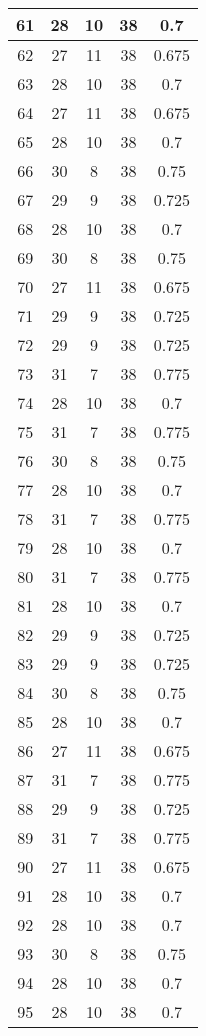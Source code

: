 \documentclass[letterpaper, 12pt]{article}
\begin{document}
\begin{longtable}{|c|c|c|c|c|}
\hline
61 & 28 & 10 & 38 & 0.7 \\
\hline
62 & 27 & 11 & 38 & 0.675 \\
\hline
63 & 28 & 10 & 38 & 0.7 \\
\hline
64 & 27 & 11 & 38 & 0.675 \\
\hline
65 & 28 & 10 & 38 & 0.7 \\
\hline
66 & 30 & 8 & 38 & 0.75 \\
\hline
67 & 29 & 9 & 38 & 0.725 \\
\hline
68 & 28 & 10 & 38 & 0.7 \\
\hline
69 & 30 & 8 & 38 & 0.75 \\
\hline
70 & 27 & 11 & 38 & 0.675 \\
\hline
71 & 29 & 9 & 38 & 0.725 \\
\hline
72 & 29 & 9 & 38 & 0.725 \\
\hline
73 & 31 & 7 & 38 & 0.775 \\
\hline
74 & 28 & 10 & 38 & 0.7 \\
\hline
75 & 31 & 7 & 38 & 0.775 \\
\hline
76 & 30 & 8 & 38 & 0.75 \\
\hline
77 & 28 & 10 & 38 & 0.7 \\
\hline
78 & 31 & 7 & 38 & 0.775 \\
\hline
79 & 28 & 10 & 38 & 0.7 \\
\hline
80 & 31 & 7 & 38 & 0.775 \\
\hline
81 & 28 & 10 & 38 & 0.7 \\
\hline
82 & 29 & 9 & 38 & 0.725 \\
\hline
83 & 29 & 9 & 38 & 0.725 \\
\hline
84 & 30 & 8 & 38 & 0.75 \\
\hline
85 & 28 & 10 & 38 & 0.7 \\
\hline
86 & 27 & 11 & 38 & 0.675 \\
\hline
87 & 31 & 7 & 38 & 0.775 \\
\hline
88 & 29 & 9 & 38 & 0.725 \\
\hline
89 & 31 & 7 & 38 & 0.775 \\
\hline
90 & 27 & 11 & 38 & 0.675 \\
\hline
91 & 28 & 10 & 38 & 0.7 \\
\hline
92 & 28 & 10 & 38 & 0.7 \\
\hline
93 & 30 & 8 & 38 & 0.75 \\
\hline
94 & 28 & 10 & 38 & 0.7 \\
\hline
95 & 28 & 10 & 38 & 0.7 \\

\end{longtable}
\end{document}

